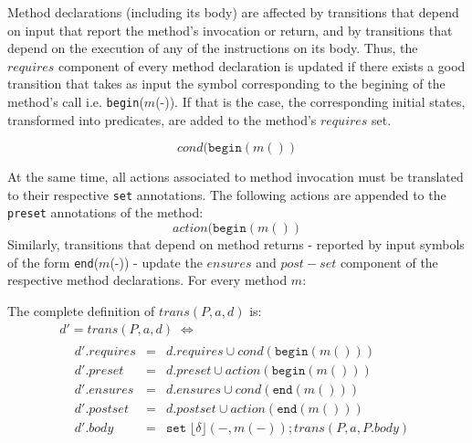 \documentclass[10pt,notitlepage,twoside]{article}
\newcommand{\aut}{a}
\newcommand{\floor}[1]{\lfloor #1 \rfloor}
\begin{document}
Method declarations (including its body) are affected by transitions that depend on input that report the method's invocation or return, and by transitions that depend on the execution of any of the instructions on its body.
Thus, the $\mathit{requires}$ component of every method declaration is updated if there exists a good transition that takes as input the symbol corresponding to the begining of the method's call i.e. \texttt{begin}($m$(-)). If that is the case, the corresponding initial states, transformed into predicates, are added to the method's $\mathit{requires}$ set.

\begin{displaymath}
\mathit{cond}(\texttt{begin}(m())
\end{displaymath}

At the same time, all actions associated to method invocation  must be translated to their respective \texttt{set} annotations. The following actions are appended to the \texttt{preset} annotations of the method:
\begin{displaymath}
\mathit{action}(\texttt{begin}(m())
\end{displaymath}
Similarly, transitions that depend on method returns - reported by input symbols of the form \texttt{end}($m$(-)) - update the $\mathit{ensures}$ and $\mathit{post-set}$ component of the respective method declarations. For every method $m$:

The complete definition of $\mathit{trans}(P,\aut,d)$ is:
\begin{displaymath}
\begin{array}{l}
d' = \mathit{trans}(P,\aut,d) \;\Leftrightarrow\;  \\
\;\;\ \begin{array}{rcl}
d'.\mathit{requires} & = & d.\mathit{requires} \cup \mathit{cond}(\texttt{begin}(m()))  \\
d'.\mathit{preset} & = & d.\mathit{preset} \cup \mathit{action}(\texttt{begin}(m()))  \\
d'.\mathit{ensures} & = & d.\mathit{ensures} \cup \mathit{cond}(\texttt{end}(m())) \\
d'.\mathit{postset} & = & d.\mathit{postset} \cup \mathit{action}(\texttt{end}(m()))  \\
d'.\mathit{body} & = & \texttt{set}\;\floor{\delta}(-,m(-))  ; \mathit{trans}(P,\aut,P.\mathit{body}) 
\end{array}
\end{array}
\end{displaymath}
\end{document}
